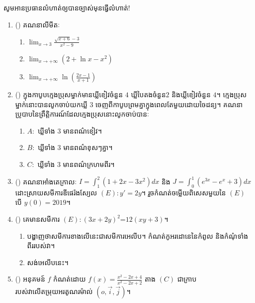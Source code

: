 \documentclass{officialexam}
\begin{document}
\begin{center}
\sffamily\color{blue}
សូមអានប្រធានលំហាត់ឲ្យបានច្បាស់មុនធ្វើលំហាត់!
\end{center}
\newpage
{\maketitle}
\begin{enumerate}[m]
	\item {\color{khtug}()} គណនាលីមីតៈ
	\begin{enumerate}[k,3]
		\item $\lim_{x\to 3}\frac{\sqrt{x+6}-3}{x^2-9}$
		\item $\lim_{x\to +\infty}\left(2+\ln x-x^2\right)$
		\item $\lim_{x\to +\infty}\ln\left(\frac{2x-1}{x+1}\right)$
	\end{enumerate}
	\item {\color{khtug}()} ក្នុងកាបូបក្មេងប្រុសម្នាក់មានឃ្លីខៀវចំនួន $4$ ឃ្លីបៃតងចំនួន​ $2$ និងឃ្លីខៀវចំនួន $4$។ ក្មេងប្រុសម្នាក់នោះបានលូកចាប់យកឃ្លី $3$ ចេញពីកាបូបព្រមគ្នាក្នុងពេលតែមួយដោយចៃដន្យ។ គណនាប្រូបាបនៃព្រឹត្តិការណ៍ដែលក្មេងប្រុសនោះលូកចាប់បានៈ
	\begin{enumerate}[k,3]
		\item $A:$ ឃ្លីទាំង $3$ មានពណ៌ខៀវ។
		\item $B:$ ឃ្លីទាំង $3$ មានពណ៌ខុសៗគ្នា។
		\item $C:$ ឃ្លីទាំង $3$ មានពណ៌ក្រហមពីរ។
	\end{enumerate}
	\item {\color{khtug}()} {\color{khtug}} គណនាអាំងតេក្រាលៈ $I=\int_{1}^{2}\left(1+2x-3x^2\right)dx$ និង $J=\int_{0}^{1}\left(e^{3x}-e^{x}+3\right)dx$\\
	{\color{khtug}} ដោះស្រាយសមីការឌីផេរ៉ងស្យែល $\left(E\right):y'=2y$។ រួចកំណត់ចម្លើយពិសេសមួយនៃ $\left(E\right)$ បើ $y(0)=2019$។
	\item {\color{khtug}()} គេមានសមីការ $\left(E\right):\left(3x+2y\right)^2$=$12\left(xy+3\right)$។
	\begin{enumerate}[k]
		\item បង្ហាញថាសមីការខាងលើនេះជាសមីការអេលីប​។ កំណត់កូអរដោនេនៃកំពូល និងកំណុំទាំងពីររបស់វា។
		\item សង់អេលីបនេះ។
	\end{enumerate}
	\item {\color{khtug}()} អនុគមន៍ $f$ កំណត់ដោយ $f(x)=\frac{x^2-2x+4}{x^2-2x+2}$ តាង $\left(C\right)$ ជាក្រាបរបស់វាលើតម្រុយអរតូណរម៉ាល់ $\left(o,\vec{i},\vec{j}\right)$។

\end{enumerate}
\end{document}
